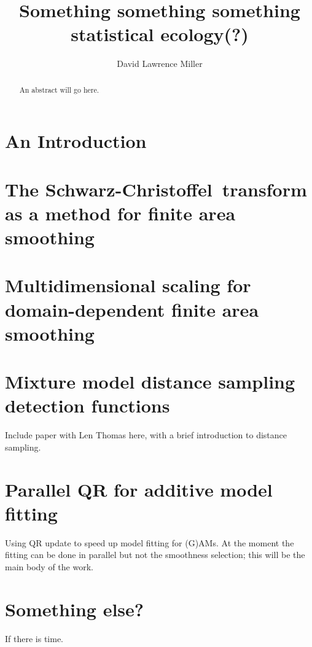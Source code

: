 \documentclass{report}
\title{Something something something statistical ecology(?)}
\author{David Lawrence Miller}
\newcommand{\sch}{Schwarz-Christoffel}
\begin{document}
\maketitle
\begin{abstract} 
An abstract will go here.
\end{abstract}




\tableofcontents

\listoffigures

\chapter{An Introduction}



\chapter{The \sch\ transform as a method for finite area smoothing}



\chapter{Multidimensional scaling for domain-dependent finite area smoothing}



\chapter{Mixture model distance sampling detection functions}

Include paper with Len Thomas here, with a brief introduction to distance sampling.

\chapter{Parallel QR for additive model fitting}

Using QR update to speed up model fitting for (G)AMs. At the moment the fitting can be done in parallel but not the smoothness selection; this will be the main body of the work.

\chapter{Something else?}

If there is time.




\end{document}
